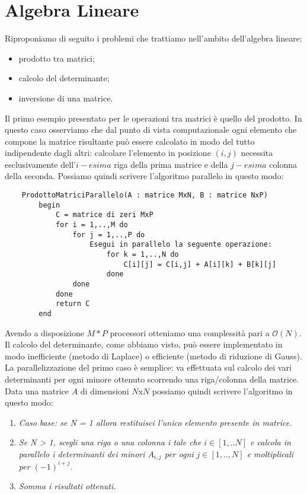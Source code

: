 \section{Algebra Lineare}
Riproponiamo di seguito i problemi che trattiamo nell'ambito dell'algebra lineare:
\begin{itemize}
\item{prodotto tra matrici;}
\item{calcolo del determinante;}
\item{inversione di una matrice.}
\end{itemize}
Il primo esempio presentato per le operazioni tra matrici è quello del prodotto. In questo caso osserviamo che dal punto di vista computazionale ogni elemento che compone la matrice risultante può essere calcolato in modo del tutto indipendente dagli altri: calcolare l'elemento in posizione $(i,j)$ necessita esclusivamente dell'$i-esima$ riga della prima matrice e della $j-esima$ colonna della seconda. Possiamo quindi scrivere l'algoritmo parallelo in questo modo:
\begin{verbatim}
    ProdottoMatriciParallelo(A : matrice MxN, B : matrice NxP)
        begin
            C = matrice di zeri MxP
            for i = 1,..,M do
                for j = 1,..,P do
                    Esegui in parallelo la seguente operazione:
                        for k = 1,..,N do
                            C[i][j] = C[i,j] + A[i][k] + B[k][j]
                        done
                done
            done
            return C
        end
\end{verbatim}
Avendo a disposizione $M*P$ processori otteniamo una complessità pari a $\mathcal{O}(N)$.\\
Il calcolo del determinante, come abbiamo visto, può essere implementato in modo inefficiente (metodo di Laplace) o efficiente (metodo di riduzione di Gauss). La parallelizzazione del primo caso è semplice: va effettuata sul calcolo dei vari determinanti per ogni minore ottenuto scorrendo una riga/colonna della matrice. Data una matrice $A$ di dimensioni $N$x$N$ possiamo quindi scrivere l'algoritmo in questo modo:
\begin{enumerate}
\item{\textit{Caso base: se N = 1 allora restituisci l'unico elemento presente in matrice.}}
\item{\textit{Se N > 1, scegli una riga o una colonna i tale che $i \in [1,..N]$ e calcola in parallelo i determinanti dei minori $A_{i,j}$ per ogni $j \in [1,..,N]$ e moltiplicali per $(-1)^{i+j}$.}}
\item{\textit{Somma i risultati ottenuti.}}
\end{enumerate}
